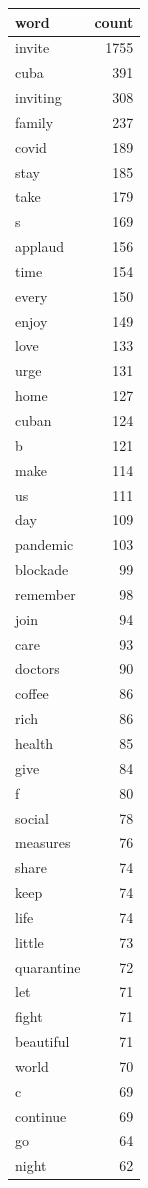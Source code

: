 \begin{tabular}{lr}
\toprule
word & count \\
\midrule
invite & 1755 \\
cuba & 391 \\
inviting & 308 \\
family & 237 \\
covid & 189 \\
stay & 185 \\
take & 179 \\
s & 169 \\
applaud & 156 \\
time & 154 \\
every & 150 \\
enjoy & 149 \\
love & 133 \\
urge & 131 \\
home & 127 \\
cuban & 124 \\
b & 121 \\
make & 114 \\
us & 111 \\
day & 109 \\
pandemic & 103 \\
blockade & 99 \\
remember & 98 \\
join & 94 \\
care & 93 \\
doctors & 90 \\
coffee & 86 \\
rich & 86 \\
health & 85 \\
give & 84 \\
f & 80 \\
social & 78 \\
measures & 76 \\
share & 74 \\
keep & 74 \\
life & 74 \\
little & 73 \\
quarantine & 72 \\
let & 71 \\
fight & 71 \\
beautiful & 71 \\
world & 70 \\
c & 69 \\
continue & 69 \\
go & 64 \\
night & 62 \\

\end{tabular}
